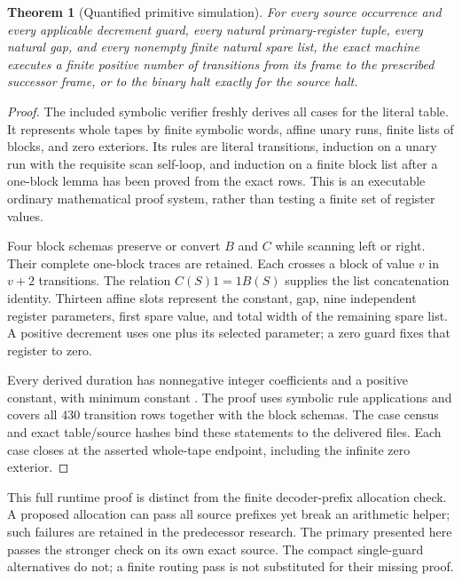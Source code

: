 \documentclass[11pt]{article}
\newtheorem{theorem}{Theorem}[section]
\begin{document}
\begin{theorem}[Quantified primitive simulation]
For every source occurrence and every applicable decrement guard, every natural primary-register tuple, every natural gap, and every nonempty finite natural spare list, the exact machine executes a finite positive number of transitions from its frame to the prescribed successor frame, or to the binary halt exactly for the source halt.
\end{theorem}
\begin{proof}
The included symbolic verifier freshly derives all \CaseCount{} cases for the literal table. It represents whole tapes by finite symbolic words, affine unary runs, finite lists of blocks, and zero exteriors. Its rules are literal transitions, induction on a unary run with the requisite scan self-loop, and induction on a finite block list after a one-block lemma has been proved from the exact rows. This is an executable ordinary mathematical proof system, rather than testing a finite set of register values.

Four block schemas preserve or convert $B$ and $C$ while scanning left or right. Their complete one-block traces are retained. Each crosses a block of value $v$ in $v+2$ transitions. The relation $C(S)1=1B(S)$ supplies the list concatenation identity. Thirteen affine slots represent the constant, gap, nine independent register parameters, first spare value, and total width of the remaining spare list. A positive decrement uses one plus its selected parameter; a zero guard fixes that register to zero.

Every derived duration has nonnegative integer coefficients and a positive constant, with minimum constant \MinDuration. The proof uses \RuleCount{} symbolic rule applications and covers all 430 transition rows together with the block schemas. The case census and exact table/source hashes bind these statements to the delivered files. Each case closes at the asserted whole-tape endpoint, including the infinite zero exterior.
\end{proof}

This full runtime proof is distinct from the finite decoder-prefix allocation check. A proposed allocation can pass all source prefixes yet break an arithmetic helper; such failures are retained in the predecessor research. The primary presented here passes the stronger check on its own exact source. The compact single-guard alternatives do not; a finite routing pass is not substituted for their missing proof.
\end{document}
